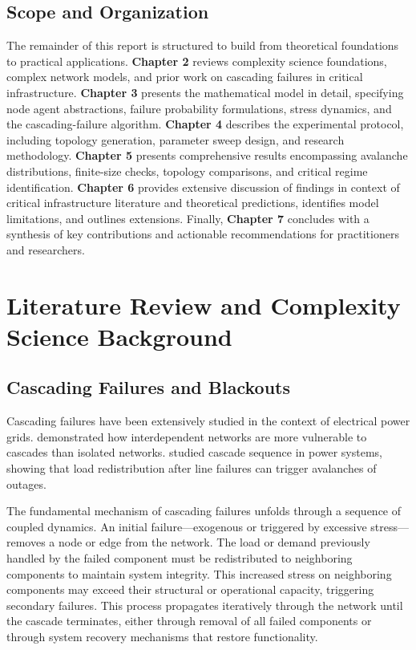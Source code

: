 \documentclass[12pt,a4paper,twoside]{report}
\begin{document}
\section{Scope and Organization}

The remainder of this report is structured to build from theoretical foundations to practical applications. \textbf{Chapter 2} reviews complexity science foundations, complex network models, and prior work on cascading failures in critical infrastructure. \textbf{Chapter 3} presents the mathematical model in detail, specifying node agent abstractions, failure probability formulations, stress dynamics, and the cascading-failure algorithm. \textbf{Chapter 4} describes the experimental protocol, including topology generation, parameter sweep design, and research methodology. \textbf{Chapter 5} presents comprehensive results encompassing avalanche distributions, finite-size checks, topology comparisons, and critical regime identification. \textbf{Chapter 6} provides extensive discussion of findings in context of critical infrastructure literature and theoretical predictions, identifies model limitations, and outlines extensions. Finally, \textbf{Chapter 7} concludes with a synthesis of key contributions and actionable recommendations for practitioners and researchers.

\chapter{Literature Review and Complexity Science Background}

\section{Cascading Failures and Blackouts}

Cascading failures have been extensively studied in the context of electrical power grids. \citet{buldyrev2010} demonstrated how interdependent networks are more vulnerable to cascades than isolated networks. \citet{holmgren2006} studied cascade sequence in power systems, showing that load redistribution after line failures can trigger avalanches of outages.

The fundamental mechanism of cascading failures unfolds through a sequence of coupled dynamics. An initial failure---exogenous or triggered by excessive stress---removes a node or edge from the network. The load or demand previously handled by the failed component must be redistributed to neighboring components to maintain system integrity. This increased stress on neighboring components may exceed their structural or operational capacity, triggering secondary failures. This process propagates iteratively through the network until the cascade terminates, either through removal of all failed components or through system recovery mechanisms that restore functionality.
\end{document}
